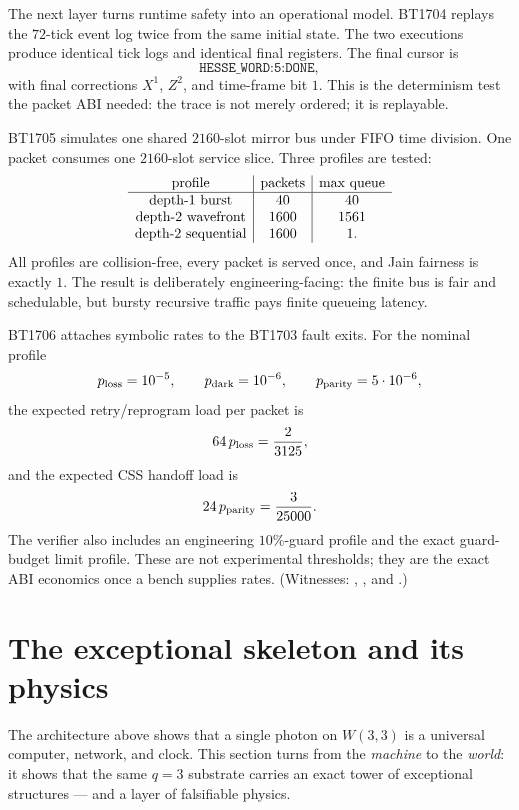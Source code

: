 \documentclass[11pt]{article}
\newcommand{\W}{W(3,3)}
\begin{document}
The next layer turns runtime safety into an operational model.  BT1704 replays
the \(72\)-tick event log twice from the same initial state.  The two executions
produce identical tick logs and identical final registers.  The final cursor is
\[
  \texttt{HESSE\_WORD:5:DONE},
\]
with final corrections \(X^1\), \(Z^2\), and time-frame bit \(1\).  This is the
determinism test the packet ABI needed: the trace is not merely ordered; it is
replayable.

BT1705 simulates one shared \(2160\)-slot mirror bus under FIFO time division.
One packet consumes one \(2160\)-slot service slice.  Three profiles are tested:
\[
\begin{array}{c|c|c}
\hbox{profile} & \hbox{packets} & \hbox{max queue}\\
\hline
\hbox{depth-1 burst} & 40 & 40\\
\hbox{depth-2 wavefront} & 1600 & 1561\\
\hbox{depth-2 sequential} & 1600 & 1.
\end{array}
\]
All profiles are collision-free, every packet is served once, and Jain fairness
is exactly \(1\).  The result is deliberately engineering-facing: the finite bus
is fair and schedulable, but bursty recursive traffic pays finite queueing
latency.

BT1706 attaches symbolic rates to the BT1703 fault exits.  For the nominal
profile
\[
  p_{\rm loss}=10^{-5},\qquad
  p_{\rm dark}=10^{-6},\qquad
  p_{\rm parity}=5\cdot10^{-6},
\]
the expected retry/reprogram load per packet is
\[
  64\,p_{\rm loss}=\frac{2}{3125},
\]
and the expected CSS handoff load is
\[
  24\,p_{\rm parity}=\frac{3}{25000}.
\]
The verifier also includes an engineering \(10\%\)-guard profile and the exact
guard-budget limit profile.  These are not experimental thresholds; they are
the exact ABI economics once a bench supplies rates.  (Witnesses:
,
, and
.)

\section{The exceptional skeleton and its physics}
\label{sec:exceptional}

The architecture above shows that a single photon on $\W$ is a universal
computer, network, and clock. This section turns from the \emph{machine} to the
\emph{world}: it shows that the same $q=3$ substrate carries an exact tower of
exceptional structures --- and a layer of falsifiable physics.
\end{document}

